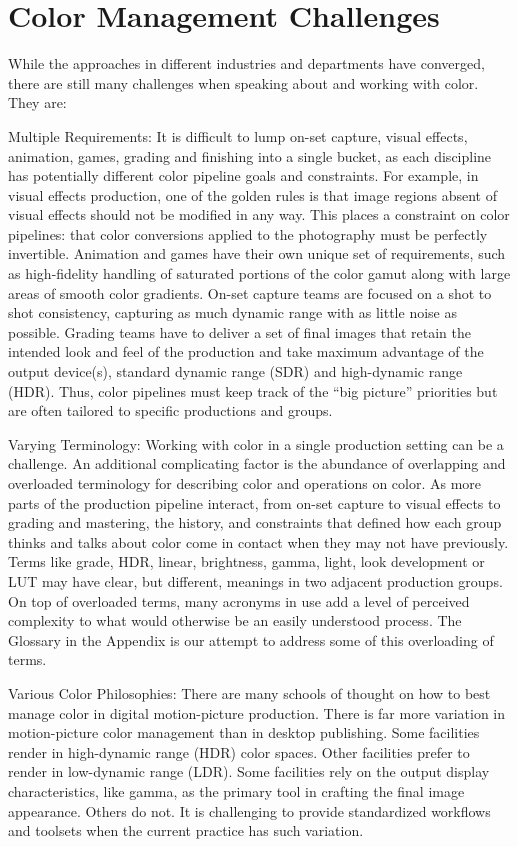 \section{Color Management Challenges}
\label{sec:color-management-challenges}

While the approaches in different industries and departments have converged, there are still many challenges when speaking about and working with color. They are:

Multiple Requirements: It is difficult to lump on-set capture, visual effects, animation, games, grading and finishing into a single bucket, as each discipline has potentially different color pipeline goals and constraints. For example, in visual effects production, one of the golden rules is that image regions absent of visual effects should not be modified in any way. This places a constraint on color pipelines: that color conversions applied to the photography must be perfectly invertible. Animation and games have their own unique set of requirements, such as high-fidelity handling of saturated portions of the color gamut along with large areas of smooth color gradients. On-set capture teams are focused on a shot to shot consistency, capturing as much dynamic range with as little noise as possible. Grading teams have to deliver a set of final images that retain the intended look and feel of the production and take maximum advantage of the output device(s), standard dynamic range (SDR) and high-dynamic range (HDR). Thus, color pipelines must keep track of the “big picture” priorities but are often tailored to specific productions and groups.

Varying Terminology: Working with color in a single production setting can be a challenge. An additional complicating factor is the abundance of overlapping and overloaded terminology for describing color and operations on color. As more parts of the production pipeline interact, from on-set capture to visual effects to grading and mastering, the history, and constraints that defined how each group thinks and talks about color come in contact when they may not have previously. Terms like grade, HDR, linear, brightness, gamma, light, look development or LUT may have clear, but different, meanings in two adjacent production groups. On top of overloaded terms, many acronyms in use add a level of perceived complexity to what would otherwise be an easily understood process. The Glossary in the Appendix is our attempt to address some of this overloading of terms.

Various Color Philosophies: There are many schools of thought on how to best manage color in digital motion-picture production. There is far more variation in motion-picture color management than in desktop publishing. Some facilities render in high-dynamic range (HDR) color spaces. Other facilities prefer to render in low-dynamic range (LDR). Some facilities rely on the output display characteristics, like gamma, as the primary tool in crafting the final image appearance. Others do not. It is challenging to provide standardized workflows and toolsets when the current practice has such variation.

